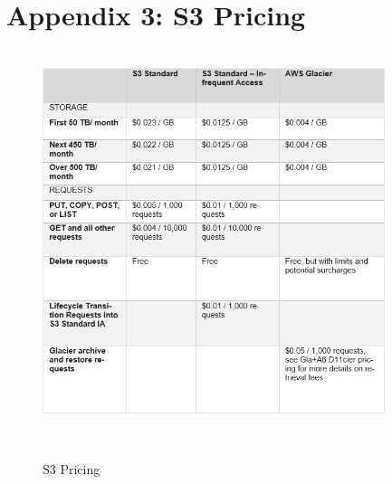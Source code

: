 \documentclass[runningheads]{llncs}
\begin{document}
\newpage
\section{Appendix 3: S3 Pricing}

\begin{figure}[H]
    \centering
    \includegraphics[width=10cm]{pic/S3-pricing.png}
    \caption{S3 Pricing\cite{aws-s3-costs}}
    \label{S3 Pricing}
\end{figure}
\end{document}

